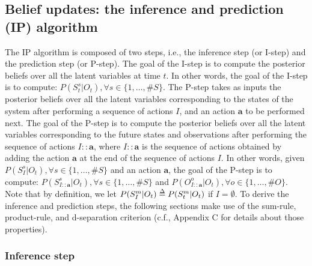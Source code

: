 \documentclass[twoside,11pt]{article}
\def\delequal{\mathrel{\ensurestackMath{\stackon[1pt]{=}{\scriptstyle\Delta}}}}
\newcommand{\nb}[1]{\# #1}
\begin{document}
\subsection{Belief updates: the inference and prediction (IP) algorithm} \label{ssec:IP_algorithm}

The IP algorithm is composed of two steps, i.e., the inference step (or I-step) and the prediction step (or P-step). The goal of the I-step is to compute the posterior beliefs over all the latent variables at time $t$. In other words, the goal of the I-step is to compute: $P(S_t^s|O_t), \forall s \in \{1, \hdots, \nb{S}\}$. The P-step takes as inputs the posterior beliefs over all the latent variables corresponding to the states of the system after performing a sequence of actions $I$, and an action $\bm{a}$ to be performed next. The goal of the P-step is to compute the posterior beliefs over all the latent variables corresponding to the future states and observations after performing the sequence of actions $I{::}\bm{a}$, where $I{::}\bm{a}$ is the sequence of actions obtained by adding the action $\bm{a}$ at the end of the sequence of actions $I$. In other words, given $P(S_I^s|O_t), \forall s \in \{1, \hdots, \nb{S}\}$ and an action $\bm{a}$, the goal of the P-step is to compute: $P(S_{I{::}\bm{a}}^s|O_t), \forall s \in \{1, \hdots, \nb{S}\}$ and $P(O_{I{::}\bm{a}}^o|O_t), \forall o \in \{1, \hdots, \nb{O}\}$. Note that by definition, we let $P(S_I^m|O_t) \delequal P(S_t^m|O_t)$ if $I = \emptyset$. To derive the inference and prediction steps, the following sections make use of the sum-rule, product-rule, and d-separation criterion (c.f., Appendix C for details about those properties).

\subsubsection{Inference step} \label{ssec:i_step}
\end{document}
